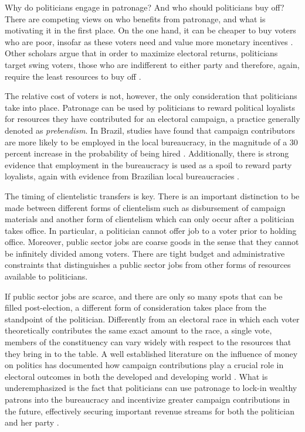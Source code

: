 \documentclass[12pt,a4paper]{article}
\begin{document}
Why do politicians engage in patronage? And who should politicians buy off? There are competing views on who benefits from patronage, and what is motivating it in the first place. On the one hand, it can be cheaper to buy voters who are poor, insofar as these voters need and value more monetary incentives \citet{stokes2013brokers}. Other scholars argue that in order to maximize electoral returns, politicians target swing voters, those who are indifferent to either party and therefore, again, require the least resources to buy off \citet{dixit1996determinants}.

The relative cost of voters is not, however, the only consideration that politicians take into place. Patronage can be used by politicians to reward political loyalists for resources they have contributed for an electoral campaign, a practice generally denoted as \emph{prebendism}\citep{van2007meet}. In Brazil, studies have found that campaign contributors are more likely to be employed in the local bureaucracy, in the magnitude of a 30 percent increase in the probability of being hired \citep{colonnelli2018patronage}. Additionally, there is strong evidence that employment in the bureaucracy is used as a spoil to reward party loyalists, again with evidence from Brazilian local bureaucracies \citep{brollo2017victor}.

The timing of clientelistic transfers is key. There is an important distinction to be made between different forms of clientelism such as disbursement of campaign materials \citep{stokes2005perverse,nichter2008vote} and another form of clientelism which can only occur after a politician takes office. In particular, a politician cannot offer job to a voter prior to holding office. Moreover, public sector jobs are coarse goods in the sense that they cannot be infinitely divided among voters. There are tight budget and administrative constraints that distinguishes a public sector jobs from other forms of resources available to politicians.

If public sector jobs are scarce, and there are only so many spots that can be filled post-election, a different form of consideration takes place from the standpoint of the politician. Differently from an electoral race in which each voter theoretically contributes the same exact amount to the race, a single vote, members of the constituency can vary widely with respect to the resources that they bring in to the table. A well established literature on the influence of money on politics has documented how campaign contributions play a crucial role in electoral outcomes in both the developed and developing world \citep{claessens2008political}. What is underemphasized is the fact that politicians can use patronage to lock-in wealthy patrons into the bureaucracy and incentivize greater campaign contributions in the future, effectively securing important revenue streams for both the politician and her party \citep{robinson2013political}.
\end{document}
